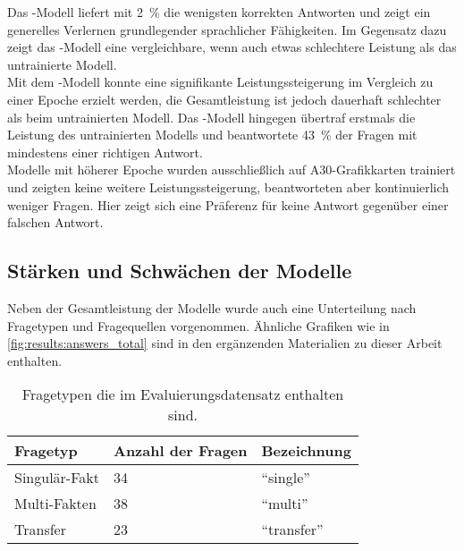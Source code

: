 Das \liv-Modell liefert mit \SI{2}{\percent} die wenigsten korrekten Antworten und zeigt ein generelles Verlernen grundlegender sprachlicher Fähigkeiten.
Im Gegensatz dazu zeigt das \lia-Modell eine vergleichbare, wenn auch etwas schlechtere Leistung als das untrainierte Modell.\\

Mit dem \lev-Modell konnte eine signifikante Leistungssteigerung im Vergleich zu einer Epoche erzielt werden, die Gesamtleistung ist jedoch dauerhaft schlechter als beim untrainierten Modell.
Das \lea-Modell hingegen übertraf erstmals die Leistung des untrainierten Modells und beantwortete \SI{43}{\percent} der Fragen mit mindestens einer richtigen Antwort.\\

Modelle mit höherer Epoche wurden ausschließlich auf A30-Grafikkarten trainiert und zeigten keine weitere Leistungssteigerung, beantworteten aber kontinuierlich weniger Fragen.
Hier zeigt sich eine Präferenz für keine Antwort gegenüber einer falschen Antwort.\\

\subsection{Stärken und Schwächen der Modelle}\label{subsec:results:correctness:strengths}
Neben der Gesamtleistung der Modelle wurde auch eine Unterteilung nach Fragetypen und Fragequellen vorgenommen.
Ähnliche Grafiken wie in \cref{fig:results:answers_total} sind in den ergänzenden Materialien zu dieser Arbeit enthalten.

\begin{table}
    \centering
    \begin{tabular}{lll}
        \toprule
        \textbf{Fragetyp} & \textbf{Anzahl der Fragen} & \textbf{Bezeichnung} \\
        \midrule
        Singulär-Fakt     & 34                         & \enquote{single}     \\
        Multi-Fakten      & 38                         & \enquote{multi}      \\
        Transfer          & 23                         & \enquote{transfer}   \\
        \bottomrule
    \end{tabular}
    \caption{Fragetypen die im Evaluierungsdatensatz enthalten sind.}\label{tab:eval-question-types}
\end{table}


